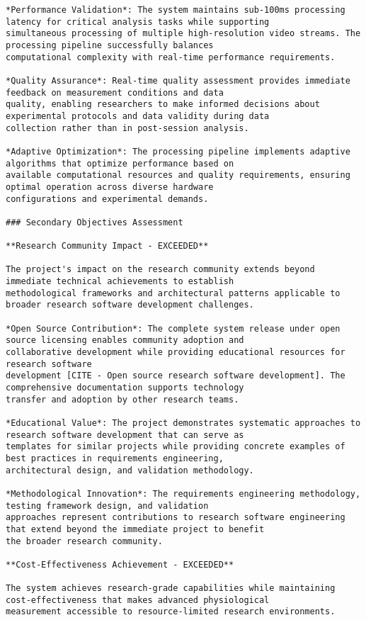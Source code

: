 \documentclass[12pt,a4paper]{report}
\begin{document}
\begin{verbatim}
*Performance Validation*: The system maintains sub-100ms processing latency for critical analysis tasks while supporting
simultaneous processing of multiple high-resolution video streams. The processing pipeline successfully balances
computational complexity with real-time performance requirements.

*Quality Assurance*: Real-time quality assessment provides immediate feedback on measurement conditions and data
quality, enabling researchers to make informed decisions about experimental protocols and data validity during data
collection rather than in post-session analysis.

*Adaptive Optimization*: The processing pipeline implements adaptive algorithms that optimize performance based on
available computational resources and quality requirements, ensuring optimal operation across diverse hardware
configurations and experimental demands.

### Secondary Objectives Assessment

**Research Community Impact - EXCEEDED**

The project's impact on the research community extends beyond immediate technical achievements to establish
methodological frameworks and architectural patterns applicable to broader research software development challenges.

*Open Source Contribution*: The complete system release under open source licensing enables community adoption and
collaborative development while providing educational resources for research software
development [CITE - Open source research software development]. The comprehensive documentation supports technology
transfer and adoption by other research teams.

*Educational Value*: The project demonstrates systematic approaches to research software development that can serve as
templates for similar projects while providing concrete examples of best practices in requirements engineering,
architectural design, and validation methodology.

*Methodological Innovation*: The requirements engineering methodology, testing framework design, and validation
approaches represent contributions to research software engineering that extend beyond the immediate project to benefit
the broader research community.

**Cost-Effectiveness Achievement - EXCEEDED**

The system achieves research-grade capabilities while maintaining cost-effectiveness that makes advanced physiological
measurement accessible to resource-limited research environments.


\end{verbatim}
\end{document}
